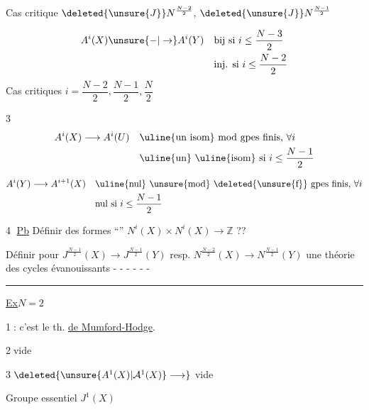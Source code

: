 Cas critique \uline{$\deleted{\unsure{J}}N^{\frac{N-2}2}$}, $\deleted{\unsure{J}}N^{\frac{N-1}2}$

\[
\begin{aligned}
 A^i(X)\unsure{\mathord{-}|\to} A^i(Y)&\quad\text{bij si }i\leq\frac{N-3}2\\
 &\quad\text{inj. si }i\leq\frac{N-2}2
\end{aligned}
\]
Cas critiques $i=\dfrac{N-2}2,\dfrac{N-1}{2},\dfrac N2$

\textcircled{3}
\[
\begin{aligned}
 A^i(X)\longrightarrow A^i(U)&\quad\text{\uline{un isom} mod gpes finis, }\forall i\\
 &\quad\text{\uline{un} \uline{isom} si } i\leq\frac{N-1}2
\end{aligned}
\]

\[
\begin{aligned}
 A^i(Y)\longrightarrow A^{i+1}(X)&\quad\text{\uline{nul} \unsure{mod} \deleted{\unsure{f}} gpes finis, }\forall i\\
 &\quad\text{nul si } i\leq\frac{N-1}2
\end{aligned}
\]

\textcircled{4} \uline{Pb} Définir des formes ``'' $N^i(X)\times N^i(X)\longrightarrow\mathbb Z$ ??

Définir pour $J^{\frac{N-1}2}(X)\longrightarrow J^{\frac{N-1}2}(Y)$ resp. $N^{\frac{N-2}2}(X)\longrightarrow N^{\frac{N-1}2}(Y)$ une théorie des cycles évanouissants \enspace - - - - - -

\noindent\rule{\linewidth}{0.35pt}

\uline{Ex}\quad $N=2$

\textcircled{1}\quad {}: c'est le th. \uline{de  Mumford-Hodge}.

\textcircled{2}\quad vide

\textcircled{3}\quad $\deleted{\unsure{A^1(X)|\mathcal{A}^1(X)}\longrightarrow}$ vide

Groupe  essentiel \qquad $J^1(X)$
